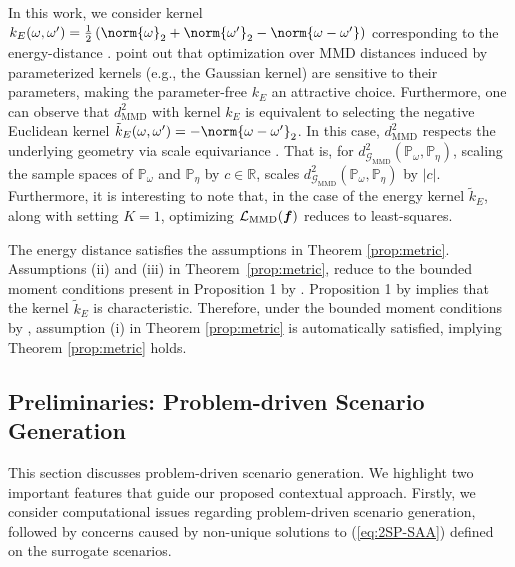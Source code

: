 In this work, we consider kernel $k_E(\omega, \omega') = \frac{1}{2} \left(\norm{\omega}_2 + \norm{\omega'}_2 - \norm{\omega - \omega'} \right)$ corresponding to the energy-distance \citep{sejdinovic2013equivalence}. \citet{sejourne2023unbalanced} point out that optimization over MMD distances induced by parameterized kernels (e.g., the Gaussian kernel) are sensitive to their parameters, making the parameter-free $k_E$ an attractive choice. Furthermore, one can observe that $d^2_{\text{MMD}}$ with kernel $k_E$ is equivalent to selecting the negative Euclidean kernel $\tilde{k}_E(\omega, \omega') = -\norm{\omega - \omega'}_2$. In this case, $d^2_{\text{MMD}}$ respects the underlying geometry via scale equivariance \citep{szekely2012uniqueness}. That is, for $d^2_{\mathcal{G}_{\text{MMD}}}(\mathbb{P}_{\omega}, \mathbb{P}_{\eta})$, scaling the sample spaces of $\mathbb{P}_{\omega}$ and $\mathbb{P}_{\eta}$ by $c \in \mathbb{R}$, scales $d^2_{\mathcal{G}_{\text{MMD}}}(\mathbb{P}_{\omega}, \mathbb{P}_{\eta})$ by $|c|$. Furthermore, it is interesting to note that, in the case of the energy kernel $\tilde{k}_E$, along with setting $K=1$, optimizing $\mathcal{L}_{\text{MMD}}(\boldsymbol{f})$ reduces to least-squares. 

The energy distance satisfies the assumptions in Theorem \ref{prop:metric}. Assumptions (ii) and (iii) in \hbox{Theorem \ref{prop:metric}}, reduce to the bounded moment conditions present in Proposition 1 by \citet{szekely2012uniqueness}. Proposition 1 by \citet{szekely2012uniqueness} implies that the kernel $\tilde{k}_E$ is characteristic. Therefore, under the bounded moment conditions by \citet{szekely2012uniqueness}, assumption (i) in Theorem \ref{prop:metric} is automatically satisfied, implying Theorem \ref{prop:metric} holds.


\subsection{Preliminaries: Problem-driven Scenario Generation}\label{subsection:prelim_PSG}
This section discusses problem-driven scenario generation. We highlight two important features that guide our proposed contextual approach. Firstly, we consider computational issues regarding problem-driven scenario generation, followed by concerns caused by non-unique solutions to (\ref{eq:2SP-SAA}) defined on the surrogate scenarios. 

